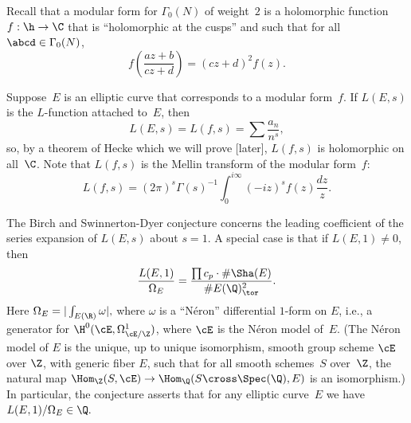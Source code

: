 \documentclass{report}
\begin{document}
Recall that a modular form for $\Gamma_0(N)$ of weight~$2$ is a holomorphic function
$f:\h\to\C$ that is ``holomorphic at the cusps'' and such that for all $\abcd\in\Gamma_0(N)$,
\[
  f\left(\frac{az+b}{cz+d}\right) = (cz+d)^{2} f(z).
\]

Suppose~$E$ is an elliptic curve that corresponds to a modular
form~$f$.  If $L(E,s)$ is the $L$-function attached to~$E$, then
\[
  L(E,s) = L(f,s) = \sum \frac{a_n}{n^s},
\]
so, by a theorem of Hecke which we will prove [later], $L(f,s)$
is holomorphic on all~$\C$.  Note that $L(f,s)$ is the Mellin transform of the
modular form~$f$:
\begin{equation}\label{eqn:mellin}
  L(f,s) = (2\pi)^s\Gamma(s)^{-1}\int_{0}^{i\infty} (-iz)^s f(z)\frac{dz}{z}.
\end{equation}

The Birch and Swinnerton-Dyer conjecture concerns the leading coefficient
of the series expansion of $L(E,s)$ about $s=1$.  A special case is that
if $L(E,1)\neq 0$, then
\[
\frac{L(E,1)}{\Omega_E} = \frac{\prod c_p \cdot \#\Sha(E)}{\#E(\Q)_{\tor}^2}.
\]
Here $\Omega_E = |\int_{E(\R)} \omega|,$ where $\omega$ is a
``N\'eron'' differential $1$-form on $E$, i.e., a generator for
$\H^0(\cE,\Omega^1_{\cE/\Z})$, where $\cE$ is the N\'eron model
of~$E$.  (The N\'eron model of $E$ is the unique, up to unique
isomorphism, smooth group scheme $\cE$ over $\Z$, with generic
fiber $E$, such that for all smooth schemes~$S$ over~$\Z$, the
natural map $\Hom_\Z(S,\cE)\to \Hom_\Q(S\cross \Spec(\Q),E)$ is an
isomorphism.)  In particular, the conjecture asserts that for any
elliptic curve~$E$ we have $L(E,1)/\Omega_E\in\Q.$
\end{document}
